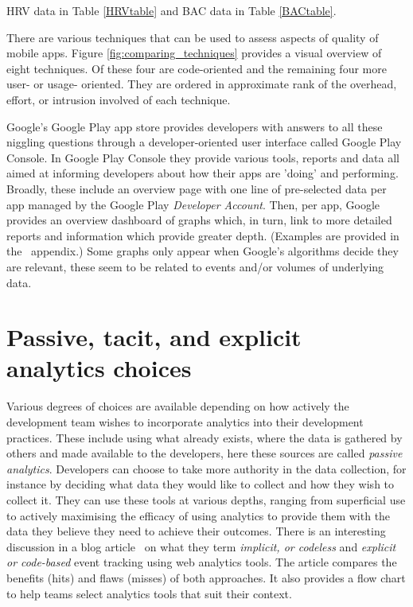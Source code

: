 HRV data in Table \ref{HRVtable} and BAC data in Table \ref{BACtable}.

There are various techniques that can be used to assess aspects of quality of mobile apps. Figure \ref{fig:comparing_techniques} provides a visual overview of eight techniques. Of these four are code-oriented and the remaining four more user- or usage- oriented. They are ordered in approximate rank of the overhead, effort, or intrusion involved of each technique. %

Google's Google Play app store provides developers with answers to all these niggling questions through a developer-oriented user interface called Google Play Console. 
In Google Play Console they provide various tools, reports and data all aimed at informing developers about how their apps are 'doing' and performing. Broadly, these include an overview page with one line of pre-selected data per app managed by the Google Play \textit{Developer Account}. Then, per app, Google provides an overview dashboard of graphs which, in turn, link to more detailed reports and information which provide greater depth. (Examples are provided in the~\href{appendix-analytics-tools}{\emph{}} appendix.)  Some graphs only appear when Google's algorithms decide they are relevant, these seem to be related to events and/or volumes of underlying data.




\section{Passive, tacit, and explicit analytics choices}
Various degrees of choices are available depending on how actively the development team wishes to incorporate analytics into their development practices. These include using what already exists, where the data is gathered by others and made available to the developers, here these sources are called \emph{passive analytics}. Developers can choose to take more authority in the data collection, for instance by deciding what data they would like to collect and how they wish to collect it. They can use these tools at various depths, ranging from superficial use to actively maximising the efficacy of using analytics to provide them with the data they believe they need to achieve their outcomes. There is an interesting discussion in a blog article~\cite{mukherjee_implicit_versus_explicit_event_tracking_hits_and_misses} on what they term \emph{implicit, or codeless} and \emph{explicit or code-based} event tracking using web analytics tools. The article compares the benefits (hits) and flaws (misses) of both approaches. It also provides a flow chart to help teams select analytics tools that suit their context.

